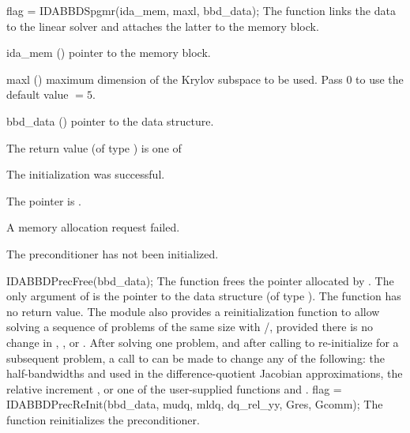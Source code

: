 {
  flag = IDABBDSpgmr(ida\_mem, maxl, bbd\_data);
}
{
  The function  links the {\idabbdpre} data to the
  {\idaspgmr} linear solver and attaches the latter to the {\ida}
  memory block.
}
{
  \begin{args}
  \item[ida\_mem] ()
    pointer to the {\ida} memory block.
  \item[maxl] ()
    maximum dimension of the Krylov subspace to be used. Pass $0$ to use the 
    default value $=5$.
  \item[bbd\_data] ()
    pointer to the {\idabbdpre} data structure.
  \end{args}
}
{
  The return value  (of type ) is one of
  \begin{args}
  \item[\Id{IDASPGMR\_SUCCESS}] 
    The {\idaspgmr} initialization was successful.
  \item[\Id{IDASPGMR\_MEM\_NULL}]
    The  pointer is .
  \item[\Id{IDASPGMR\_MEM\_FAIL}]
    A memory allocation request failed.
  \item[\Id{IDA\_PDATA\_NULL}]
    The {\idabbdpre} preconditioner has not been initialized.
  \end{args}
}
{}
{
  IDABBDPrecFree(bbd\_data);
}
{
  The function  frees the pointer allocated by
  .
}
{
  The only argument of  is the pointer to the {\idabbdpre} 
  data structure (of type ).
}
{
  The function  has no return value.
}
{}
The {\idabbdpre} module also provides a reinitialization function to allow
solving  a sequence of problems of the same size with {\idaspgmr}/{\idabbdpre},
provided there is no change in , , or .
After solving one problem, and after calling  to re-initialize 
{\ida} for a subsequent problem, a call to  can be made
to change any of the following: the half-bandwidths  and  
used in the difference-quotient Jacobian approximations, the relative increment 
, or one of the user-supplied functions  and .
{
  flag = IDABBDPrecReInit(bbd\_data, mudq, mldq, dq\_rel\_yy, Gres, Gcomm);
}
{
  The function  reinitializes the {\idabbdpre} preconditioner.
}
